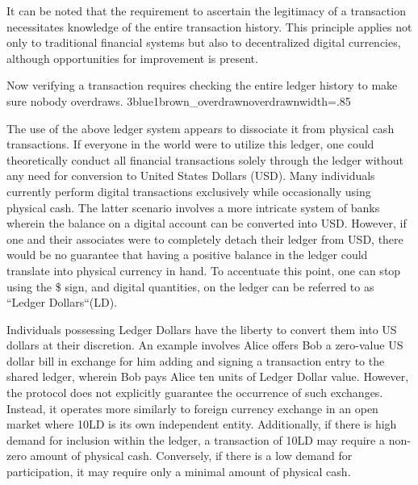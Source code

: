 It can be noted that the requirement to ascertain the legitimacy of a transaction necessitates knowledge of the entire
transaction history. This principle applies not only to traditional financial systems but also to decentralized digital
currencies, although opportunities for improvement is present.

{Now verifying a transaction requires checking the entire ledger history to make sure nobody overdraws.}
{3blue1brown_overdrawn}{overdrawn}{width=.85\textwidth}%

The use of the above ledger system appears to dissociate it from physical cash transactions. If everyone in the world were
to utilize this ledger, one could theoretically conduct all financial transactions solely through the ledger without any
need for conversion to United States Dollars (USD). Many individuals currently perform digital transactions exclusively
while occasionally using physical cash. The latter scenario involves a more intricate system of banks wherein the balance
on a digital account can be converted into USD. However, if one and their associates were to completely detach their ledger
from USD, there would be no guarantee that having a positive balance in the ledger could translate into physical currency
in hand. To accentuate this point, one can stop using the \$ sign, and digital quantities, on the ledger can be referred
to as ``Ledger Dollars``(LD).

Individuals possessing Ledger Dollars have the liberty to convert them into US dollars at their discretion. An example
involves Alice offers Bob a zero-value US dollar bill in exchange for him adding and signing a transaction entry to the
shared ledger, wherein Bob pays Alice ten units of Ledger Dollar value. However, the protocol does not explicitly guarantee
the occurrence of such exchanges. Instead, it operates more similarly to foreign currency exchange in an open market where
10LD is its own independent entity. Additionally, if there is high demand for inclusion within the ledger, a transaction
of 10LD may require a non-zero amount of physical cash. Conversely, if there is a low demand for participation, it may
require only a minimal amount of physical cash.


